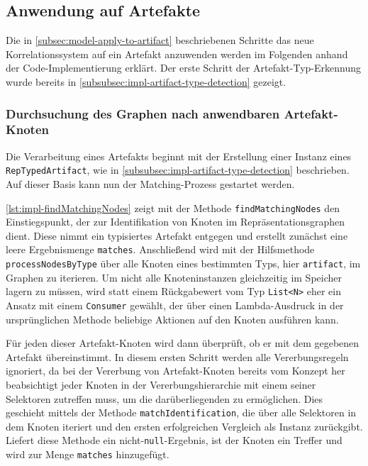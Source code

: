 \subsection{Anwendung auf Artefakte}\label{subsec:impl-apply-to-artifacts}

Die in \autoref{subsec:model-apply-to-artifact} beschriebenen Schritte das neue Korrelationssystem auf ein Artefakt anzuwenden werden im Folgenden anhand der Code-Implementierung erklärt.
Der erste Schritt der Artefakt-Typ-Erkennung wurde bereits in \autoref{subsubsec:impl-artifact-type-detection} gezeigt.

\subsubsection{Durchsuchung des Graphen nach anwendbaren Artefakt-Knoten}

Die Verarbeitung eines Artefakts beginnt mit der Erstellung einer Instanz eines \texttt{RepTypedArtifact}, wie in \autoref{subsubsec:impl-artifact-type-detection} beschrieben.
Auf dieser Basis kann nun der Matching-Prozess gestartet werden.

\autoref{lst:impl-findMatchingNodes} zeigt mit der Methode \texttt{findMatchingNodes} den Einstiegspunkt, der zur Identifikation von Knoten im Repräsentationsgraphen dient.
Diese nimmt ein typisiertes Artefakt entgegen und erstellt zunächst eine leere Ergebnismenge \texttt{matches}.
Anschließend wird mit der Hilfsmethode \texttt{processNodesByType} über alle Knoten eines bestimmten Typs, hier \texttt{artifact}, im Graphen zu iterieren.
Um nicht alle Knoteninstanzen gleichzeitig im Speicher lagern zu müssen, wird statt einem Rückgabewert vom Typ \texttt{List<N>} eher ein Ansatz mit einem \texttt{Consumer} gewählt, der über einen Lambda-Ausdruck in der ursprünglichen Methode beliebige Aktionen auf den Knoten ausführen kann.

Für jeden dieser Artefakt-Knoten wird dann überprüft, ob er mit dem gegebenen Artefakt übereinstimmt.
In diesem ersten Schritt werden alle Vererbungsregeln ignoriert, da bei der Vererbung von Artefakt-Knoten bereits vom Konzept her beabsichtigt jeder Knoten in der Vererbungshierarchie mit einem seiner Selektoren zutreffen muss, um die darüberliegenden zu ermöglichen.
Dies geschieht mittels der Methode \texttt{matchIdentification}, die über alle Selektoren in dem Knoten iteriert und den ersten erfolgreichen Vergleich als Instanz zurückgibt.
Liefert diese Methode ein nicht-\texttt{null}-Ergebnis, ist der Knoten ein Treffer und wird zur Menge \texttt{matches} hinzugefügt.

